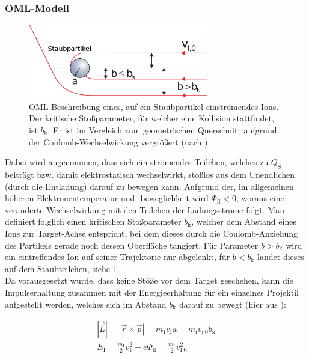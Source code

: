 \documentclass[numbers=noenddot,a4paper]{scrartcl}
\newcommand{\ix}[1]{_\text{#1}}
\begin{document}
			\subsubsection{OML-Modell}\label{subsub:oml}

						\begin{figure}
							\centering
							\includegraphics[width=0.7\textwidth, height=0.3\textwidth]{figs/orbitalmotionlimitmelzer.png}
							\caption{OML-Beschreibung eines, auf ein Staubpartikel einströmendes Ions. Der kritische Stoßparameter, für welcher eine Kollision stattfindet, ist $b\ix{k}$. Er ist im Vergleich zum geometrischen Querschnitt aufgrund der Coulomb-Wechselwirkung vergrößert (nach \cite{Melzer12}).}
							\label{img:oml}
						\end{figure}

			Dabei wird angenommen, dass sich ein strömendes Teilchen, welches zu $Q\ix{S}$ beiträgt bzw. damit elektrostatisch wechselwirkt, stoßlos aus dem Unendlichen (durch die Entladung) darauf zu bewegen kann. Aufgrund der, im allgemeinen höheren Elektronentemperatur und -beweglichkeit wird $\Phi\ix{fl}<0$, woraus eine veränderte Wechselwirkung mit den Teilchen der Ladungsströme folgt. Man definiert folglich einen kritischen Stoßparameter $b\ix{k}$, welcher dem Abstand eines Ions zur Target-Achse entspricht, bei dem dieses durch die Coulomb-Anziehung des Partikels gerade noch dessen Oberfläche tangiert. Für Parameter $b>b\ix{k}$ wird ein eintreffendes Ion auf seiner Trajektorie nur abgelenkt, für $b<b\ix{k}$ landet dieses auf dem Staubteilchen, siehe \ref{img:oml}.\\
			Da vorausgesetzt wurde, dass keine Stöße vor dem Target geschehen, kann die Impulserhaltung zusammen mit der Energieerhaltung für ein einzelnes Projektil aufgestellt werden, welches sich im Abstand $b\ix{k}$ darauf zu bewegt (hier aus \cite{Melzer12}):

				\begin{align}
					|\vec{L}|=|\vec{r}\times\vec{p}|=m\ix{I}v\ix{I}a=m\ix{i}v\ix{i,0}b\ix{k} \label{eq:impulserhaltung} \\
					E\ix{I}=\frac{m\ix{I}}{2}v\ix{I}^2+e\Phi\ix{fl}=\frac{m\ix{I}}{2}v\ix{I,0}^2 \label{eq:energieerhaltung}
				\end{align}
\end{document}
